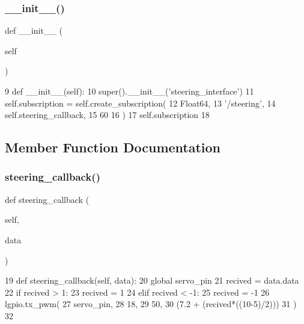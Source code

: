 \subsubsection{\texorpdfstring{\+\_\+\+\_\+init\+\_\+\+\_\+()}{\_\_init\_\_()}}
{\footnotesize\ttfamily def \+\_\+\+\_\+init\+\_\+\+\_\+ (\begin{DoxyParamCaption}\item[{}]{self }\end{DoxyParamCaption})}


\begin{DoxyCode}
9     \textcolor{keyword}{def }\_\_init\_\_(self):
10         super().\_\_init\_\_(\textcolor{stringliteral}{'steering\_interface'})
11         self.subscription = self.create\_subscription(
12                 Float64,
13                 \textcolor{stringliteral}{'/steering'},
14                 self.steering\_callback,
15                 60
16                 )
17         self.subscription
18 
\end{DoxyCode}


\subsection{Member Function Documentation}
\mbox{\label{classtoxic__hardware_1_1servo__interface_1_1SteeringInterface_a0762a6459eadaed0c4fad1263e369dbd}} 
\subsubsection{\texorpdfstring{steering\+\_\+callback()}{steering\_callback()}}
{\footnotesize\ttfamily def steering\+\_\+callback (\begin{DoxyParamCaption}\item[{}]{self,  }\item[{}]{data }\end{DoxyParamCaption})}


\begin{DoxyCode}
19     \textcolor{keyword}{def }steering\_callback(self, data):
20         \textcolor{keyword}{global} servo\_pin
21         recived = data.data
22         \textcolor{keywordflow}{if} recived > 1:
23             recived = 1
24         \textcolor{keywordflow}{elif} recived < -1:
25             recived = -1
26         lgpio.tx\_pwm(
27                 servo\_pin,
28                 18,
29                 50,
30                 (7.2 + (recived*((10-5)/2)))
31                 )
32 
\end{DoxyCode}


